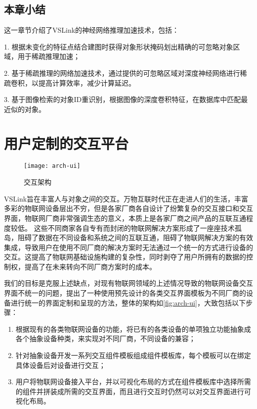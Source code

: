 
\section{本章小结}
这一章节介绍了VSLink的神经网络推理加速技术，包括：

1. 根据未变化的特征点结合建图时获得对象形状掩码划出精确的可忽略对象区域，用于稀疏推理加速；

2. 基于稀疏推理的网络加速技术，通过提供的可忽略区域对深度神经网络进行稀疏卷积，以提高计算效率，减少计算延迟。

3. 基于图像检索的对象ID重识别，根据图像的深度卷积特征，在数据库中匹配最近似的对象。


\chapter{用户定制的交互平台}
\label{chap:flexible}

\begin{figure}[htbp]
	\centering
	\texttt{[image: arch-ui]}
	\caption{交互架构}
	\label{fig:arch-ui}
\end{figure}

VSLink旨在丰富人与对象之间的交互。万物互联时代正在走进人们的生活，丰富多彩的物联网设备层出不穷，但是各家厂商各自设计了纷繁复杂的交互接口和交互界面，物联网厂商非常强调生态的意义，本质上是各家厂商之间产品的互联互通程度较低。
这些不同商家各自专有而封闭的物联网解决方案形成了一座座技术孤岛，阻碍了数据在不同设备和系统之间的互联互通，阻碍了物联网解决方案的有效集成，导致用户在使用不同厂商的解决方案时无法通过一个统一的方式进行设备的交互。这提高了物联网基础设施构建的复杂性，同时剥夺了用户所拥有的数据的控制权，提高了在未来转向不同厂商方案时的成本。

我们的目标是克服上述缺点，对现有物联网领域的上述情况导致的物联网设备交互界面不统一的问题，提出了一种使用预先设计的各类交互界面模板为不同厂商的设备进行统一的界面定制和呈现的方法，整体的架构如\autoref{fig:arch-ui}，大致包括以下步骤：

\begin{enumerate}
	\item 根据现有的各类物联网设备的功能，将已有的各类设备的单项独立功能抽象成各个抽象设备种类，来实现对不同厂商，不同设备的兼容；
	\item 针对抽象设备开发一系列交互组件模板组成组件模板库，每个模板可以在绑定具体设备后对设备进行交互；
	\item 用户将物联网设备接入平台，并以可视化布局的方式在组件模板库中选择所需的组件并拼装成所需的交互界面，而且进行交互时仍然可以对交互界面进行可视化布局。
\end{enumerate}

